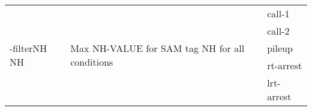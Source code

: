{\small
\begin{tabular}{@{}p{}p{}l@{}}
\multirow{5}{=}{-filterNH NH} & \multirow{5}{=}{Max NH-VALUE for SAM tag NH for all conditions} & call-1 \\
 &  & call-2 \\
 &  & pileup \\
 &  & rt-arrest \\
 &  & lrt-arrest \\
\end{tabular}\\
}
